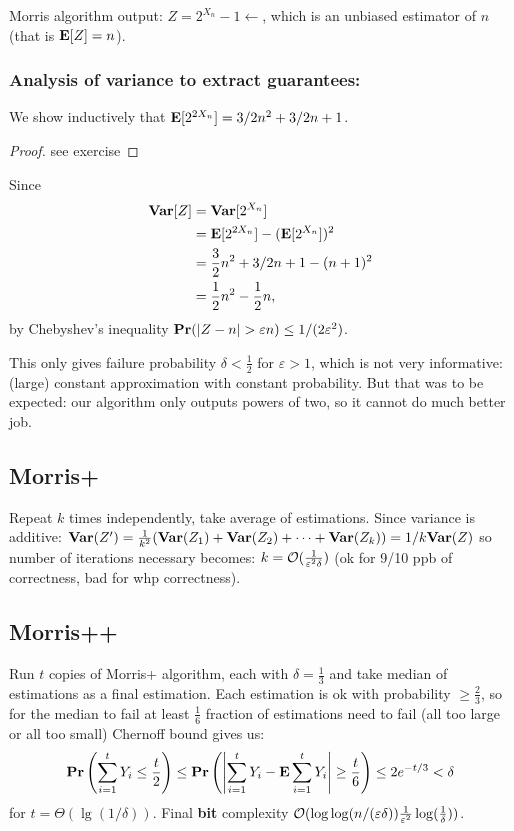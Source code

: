 \documentclass[11pt]{article}
\begin{document}
Morris algorithm output: $Z = 2^{X_{n}}-1   \leftarrow$, which is an unbiased estimator of $n$ (that is $\mathbf{E}[Z] = n$).

\subsubsection{Analysis of variance to extract guarantees:}

\begin{theorem}
We show inductively that $\mathbf{E}[2^{2X_n}] = 3/2 n^2 + 3/2 n + 1$.
\end{theorem}
\begin{proof}
see exercise
\end{proof}

Since
\begin{align*}
    \mathbf{Var}[Z] &= \mathbf{Var}[2^{X_n}] \\
    &= \mathbf{E}[2^{2 X_n} ] - (\mathbf{E}[2^{X_n}])^2 \\
    &= \frac{3}{2} n^2 + 3/2 n + 1 - (n+1)^2 \\
    &= \frac{1}{2} n^2 - \frac{1}{2}n,
\end{align*}
by Chebyshev’s inequality $\mathbf{Pr}( |Z-n| > \varepsilon n) \leq 1/(2 \varepsilon^2)$.

This only gives failure probability $\delta < \frac{1}{2}$ for $\varepsilon > 1$, which is not very informative: (large) constant approximation with constant probability. But that was to be expected: our algorithm only outputs powers of two, so it cannot do much better job.
\subsection{Morris+}
Repeat $k$ times independently, take average of estimations.
Since variance is additive: $\mathbf{Var}(Z') = \frac{1}{k^2}  (\mathbf{Var}(Z_1) + \mathbf{Var}(Z_2) + \dots + \mathbf{Var}(Z_k)) = 1/k  \mathbf{Var}(Z)$ so number of iterations necessary becomes: $k = \mathcal{O}(\frac{1}{\varepsilon^2 \delta})$
(ok for 9/10 ppb of correctness, bad for whp correctness).

\subsection{Morris++}
Run $t$ copies of Morris+ algorithm, each with $\delta = \frac{1}{3}$ and take median of estimations as a final estimation. Each estimation is ok with probability $\geq \frac{2}{3}$, so for the median to fail at least $\frac{1}{6}$ fraction of estimations need to fail (all too large or all too small)
Chernoff bound gives us:
\begin{equation}
\mathbf{Pr} \left(\sum_{i=1}^{t} Y_{i} \leq \frac{t}{2}\right) \leq \mathbf{Pr} \left(\left|\sum_{i=1}^{t} Y_{i}-\mathbf{E} \sum_{i=1}^{t} Y_{i}\right| \geq \frac{t}{6}\right) \leq 2 e^{-t / 3}<\delta
\end{equation}
for $t = \Theta(\lg (1 / \delta))$.
Final \textbf{bit} complexity $\mathcal{O}(\log \log (n/(\varepsilon \delta)) \frac{1}{\varepsilon^2} \log(\frac{1}{\delta}))$.
\end{document}
